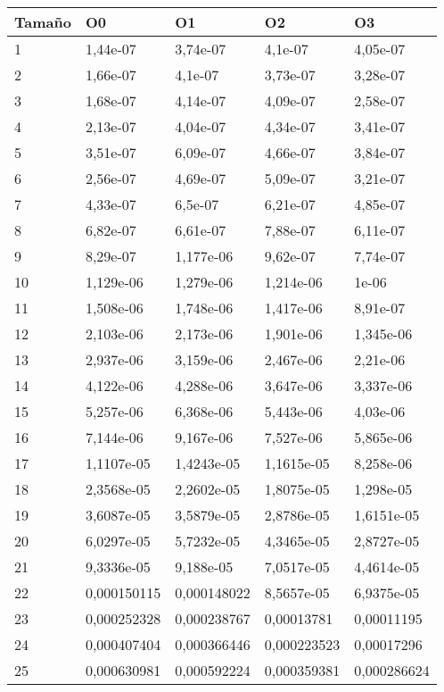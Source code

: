 \begin{tabular}{|l|l|l|l|l|}
	\hline
	Tamaño & O0 & O1 & O2 & O3 \\
	\hline
	\hline
	1 & 1,44e-07 & 3,74e-07 & 4,1e-07 & 4,05e-07 \\
	\hline
	2 & 1,66e-07 & 4,1e-07 & 3,73e-07 & 3,28e-07 \\
	\hline
	3 & 1,68e-07 & 4,14e-07 & 4,09e-07 & 2,58e-07 \\
	\hline
	4 & 2,13e-07 & 4,04e-07 & 4,34e-07 & 3,41e-07 \\
	\hline
	5 & 3,51e-07 & 6,09e-07 & 4,66e-07 & 3,84e-07 \\
	\hline
	6 & 2,56e-07 & 4,69e-07 & 5,09e-07 & 3,21e-07 \\
	\hline
	7 & 4,33e-07 & 6,5e-07 & 6,21e-07 & 4,85e-07 \\
	\hline
	8 & 6,82e-07 & 6,61e-07 & 7,88e-07 & 6,11e-07 \\
	\hline
	9 & 8,29e-07 & 1,177e-06 & 9,62e-07 & 7,74e-07 \\
	\hline
	10 & 1,129e-06 & 1,279e-06 & 1,214e-06 & 1e-06 \\
	\hline
	11 & 1,508e-06 & 1,748e-06 & 1,417e-06 & 8,91e-07 \\
	\hline
	12 & 2,103e-06 & 2,173e-06 & 1,901e-06 & 1,345e-06 \\
	\hline
	13 & 2,937e-06 & 3,159e-06 & 2,467e-06 & 2,21e-06 \\
	\hline
	14 & 4,122e-06 & 4,288e-06 & 3,647e-06 & 3,337e-06 \\
	\hline
	15 & 5,257e-06 & 6,368e-06 & 5,443e-06 & 4,03e-06 \\
	\hline
	16 & 7,144e-06 & 9,167e-06 & 7,527e-06 & 5,865e-06 \\
	\hline
	17 & 1,1107e-05 & 1,4243e-05 & 1,1615e-05 & 8,258e-06 \\
	\hline
	18 & 2,3568e-05 & 2,2602e-05 & 1,8075e-05 & 1,298e-05 \\
	\hline
	19 & 3,6087e-05 & 3,5879e-05 & 2,8786e-05 & 1,6151e-05 \\
	\hline
	20 & 6,0297e-05 & 5,7232e-05 & 4,3465e-05 & 2,8727e-05 \\
	\hline
	21 & 9,3336e-05 & 9,188e-05 & 7,0517e-05 & 4,4614e-05 \\
	\hline
	22 & 0,000150115 & 0,000148022 & 8,5657e-05 & 6,9375e-05 \\
	\hline
	23 & 0,000252328 & 0,000238767 & 0,00013781 & 0,00011195 \\
	\hline
	24 & 0,000407404 & 0,000366446 & 0,000223523 & 0,00017296 \\
	\hline
	25 & 0,000630981 & 0,000592224 & 0,000359381 & 0,000286624 \\
	\hline
\end{tabular}
